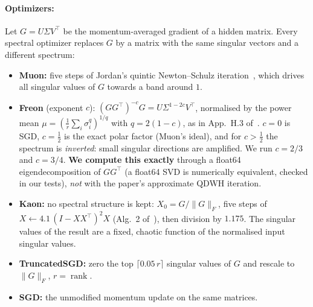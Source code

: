 \paragraph{Optimizers:}
Let $G=U\Sigma V^\top$ be the momentum-averaged gradient of a hidden matrix. Every spectral optimizer replaces $G$ by a matrix with the same singular vectors and a
different spectrum:
\begin{itemize}
  \item \textbf{Muon:} five steps of Jordan's quintic Newton--Schulz iteration~\cite{jordan}, which drives all singular values of $G$ towards a band around $1$.
  \item \textbf{Freon} (exponent $c$): $(GG^\top)^{-c}G=U\Sigma^{1-2c}V^\top$, normalised by the power mean $\mu=(\tfrac1r\sum_i\sigma_i^{q})^{1/q}$ with $q=2(1-c)$, as in App.~H.3 of~\cite{shumaylov}.
        $c=0$ is SGD, $c=\tfrac12$ is the exact polar factor (Muon's ideal), and for $c>\tfrac12$ the spectrum is \emph{inverted}: small singular directions are amplified. We run $c=2/3$ and $c=3/4$.
        \textbf{We compute this exactly} through a float64 eigendecomposition of $GG^\top$ (a float64 SVD is numerically equivalent, checked in our tests), \emph{not} with the paper's
        approximate QDWH iteration.
  \item \textbf{Kaon:} no spectral structure is kept: $X_0=G/\|G\|_F$, five steps of $X\leftarrow 4.1\,(I-XX^\top)^2X$ (Alg.~2 of~\cite{shumaylov}), then division by $1.175$. The singular values of the result are
        a fixed, chaotic function of the normalised input singular values.
  \item \textbf{TruncatedSGD:} zero the top $\lceil 0.05\,r\rceil$ singular values of $G$ and rescale to $\|G\|_F$, $r=\operatorname{rank}$.
  \item \textbf{SGD:} the unmodified momentum update on the same matrices.
\end{itemize}

